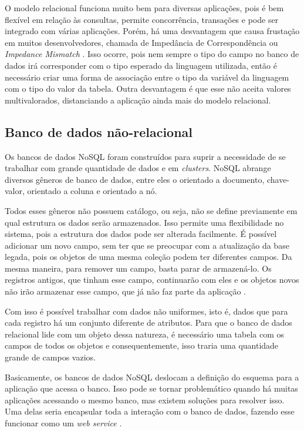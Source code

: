 O modelo relacional funciona muito bem para diversas aplicações, pois é bem flexível em relação às consultas, permite concorrência, transações e pode ser integrado com várias aplicações. Porém, há uma desvantagem que causa frustação em muitos desenvolvedores, chamada de Impedância de Correspondência ou \textit{Impedance Mismatch} \cite{Elmasri} \cite{NoSQL}. Isso ocorre, pois nem sempre o tipo do campo no banco de dados irá corresponder com o tipo esperado da linguagem utilizada, então é necessário criar uma forma de associação entre o tipo da variável da linguagem com o tipo do valor da tabela. Outra desvantagem é que esse não aceita valores multivalorados, distanciando a aplicação ainda mais do modelo relacional.


\subsection{Banco de dados não-relacional}
\label{subsec:nosqldatabasetype}
Os bancos de dados NoSQL foram construídos para suprir a necessidade de se trabalhar com grande quantidade de dados e em \textit{clusters}. NoSQL abrange diversos gêneros de banco de dados, entre eles o orientado a documento, chave-valor, orientado a coluna e orientado a nó.

Todos esses gêneros não possuem catálogo, ou seja, não se define previamente em qual estrutura os dados serão armazenados. Isso permite uma flexibilidade no sistema, pois a estrutura dos dados pode ser alterada facilmente. É possível adicionar um novo campo, sem ter que se preocupar com a atualização da base legada, pois os objetos de uma mesma coleção podem ter diferentes campos. Da mesma maneira, para remover um campo, basta parar de armazená-lo. Os registros antigos, que tinham esse campo, continuarão com eles e os objetos novos não irão armazenar esse campo, que já não faz parte da aplicação \cite{NoSQL}.

Com isso é possível trabalhar com dados não uniformes, isto é, dados que para cada registro há um conjunto diferente de atributos. Para que o banco de dados relacional lide com um objeto dessa natureza, é necessário uma tabela com os campos de todos os objetos e consequentemente, isso traria uma quantidade grande de campos vazios.

Basicamente, os bancos de dados NoSQL deslocam a definição do esquema para a aplicação que acessa o banco. Isso pode se tornar problemático quando há muitas aplicações acessando o mesmo banco, mas existem soluções para resolver isso. Uma delas seria encapsular toda a interação com o banco de dados, fazendo esse funcionar como um \textit{web service} \cite{NoSQL}.

